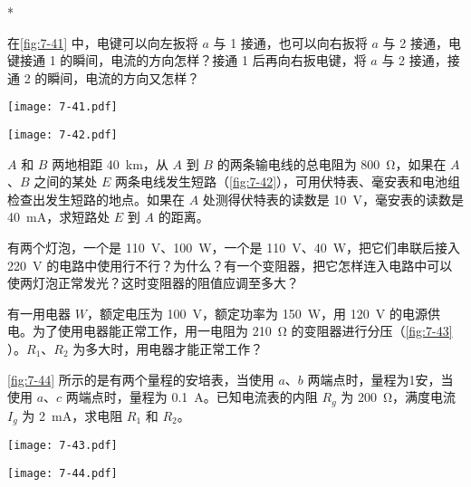 \begin{Exercise}*
\begin{question}
  \item 在\cref{fig:7-41} 中，电键可以向左扳将 $a$ 与 1 接通，也可以向右扳将 $a$ 与 2 接通，电键接通 1 的瞬间，电流的方向怎样？接通 1 后再向右扳电键，将 $a$ 与 2 接通，接通 2 的瞬间，电流的方向又怎样？
  \begin{figurehere}
    \begin{minipage}{\linewidth}
      \begin{minipage}[b]{0.48\linewidth}\centering
        \texttt{[image: 7-41.pdf]}
        \caption{}\label{fig:7-41}
      \end{minipage}
      \begin{minipage}[b]{0.48\linewidth}\centering
        \texttt{[image: 7-42.pdf]}
        \caption{}\label{fig:7-42}
      \end{minipage}
    \end{minipage}
  \end{figurehere}
  \item $A$ 和 $B$ 两地相距 \qty{40}{km}，从 $A$ 到 $B$ 的两条输电线的总电阻为 \qty{800}{\ohm}，如果在 $A$、$B$ 之间的某处 $E$ 两条电线发生短路（\cref{fig:7-42}），可用伏特表、毫安表和电池组检查出发生短路的地点。如果在 $A$ 处测得伏特表的读数是 \qty{10}{V}，毫安表的读数是 \qty{40}{mA}，求短路处 $E$ 到 $A$ 的距离。
  \item 有两个灯泡，一个是 \qty{110}{V}、\qty{100}{W}，一个是 \qty{110}{V}、\qty{40}{W}，把它们串联后接入 \qty{220}{V} 的电路中使用行不行？为什么？有一个变阻器，把它怎样连入电路中可以使两灯泡正常发光？这时变阻器的阻值应调至多大？
  \item 有一用电器 $W$，额定电压为 \qty{100}{V}，额定功率为 \qty{150}{W}，用  \qty{120}{V} 的电源供电。为了使用电器能正常工作，用一电阻为 \qty{210}{\ohm} 的变阻器进行分压（\cref{fig:7-43} ）。$R_1$、$R_2$ 为多大时，用电器才能正常工作？
  \item \cref{fig:7-44} 所示的是有两个量程的安培表，当使用 $a$、$b$ 两端点时，量程为1安，当使用 $a$、$c$ 两端点时，量程为 \qty{0.1}{A}。已知电流表的内阻 $R_g$ 为 \qty{200}{\ohm}，满度电流 $I_g$ 为 \qty{2}{mA}，求电阻 $R_1$ 和 $R_2$。
  \begin{figurehere}
    \begin{minipage}[b]{0.48\linewidth}	\centering
      \texttt{[image: 7-43.pdf]}
      \caption{}\label{fig:7-43}
    \end{minipage}
    \begin{minipage}[b]{0.48\linewidth}\centering
      \texttt{[image: 7-44.pdf]}

\end{minipage}
\end{figurehere}
\end{question}
\end{Exercise}
